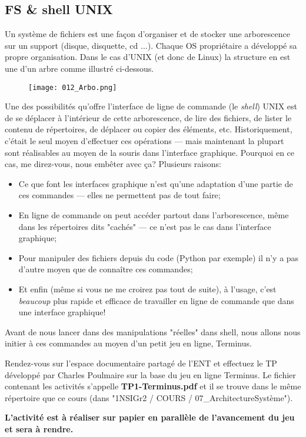 \documentclass[12pt]{article}
\begin{document}
	 
	 \subsection{FS \& shell UNIX}
	 
	 Un système de fichiers est une façon d'organiser et de stocker une arborescence sur un support (disque, disquette, cd ...). Chaque OS propriétaire a développé sa propre organisation. Dans le cas d'UNIX (et donc de Linux) la structure en est une d'un arbre comme illustré ci-dessous.
	
	\begin{figure}[H]
		\centering
		\texttt{[image: 012\_Arbo.png]}
	\end{figure}
	
	Une des possibilités qu'offre l'interface de ligne de commande (le \textit{shell}) UNIX est de se déplacer à l'intérieur de cette arborescence, de lire des fichiers, de lister le contenu de répertoires, de déplacer ou copier des éléments, etc. Historiquement, c'était le seul moyen d'effectuer ces opérations --- mais maintenant la plupart sont réalisables au moyen de la souris dans l'interface graphique. Pourquoi en ce cas, me direz-vous, nous embêter avec ça? Plusieurs raisons:
	\begin{itemize}
		\item Ce que font les interfaces graphique n'est qu'une adaptation d'une partie de ces commandes --- elles ne permettent pas de tout faire;
		\item En ligne de commande on peut accéder partout dans l'arborescence, même dans les répertoires dits "cachés" --- ce n'est pas le cas dans l'interface graphique;
		\item Pour manipuler des fichiers depuis du code (Python par exemple) il n'y a pas d'autre moyen que de connaître ces commandes;
		\item Et enfin (même si vous ne me croirez pas tout de suite), à l'usage, c'est \textit{beaucoup} plus rapide et efficace de travailler en ligne de commande que dans une interface graphique!
	\end{itemize}
	
	\begin{MonExo}
		Avant de nous lancer dans des manipulations "réelles" dans shell, nous allons nous initier à ces commandes au moyen d'un petit jeu en ligne, Terminus.
		\vspace{\baselineskip}
		
		Rendez-vous sur l'espace documentaire partagé de l'ENT et effectuez le TP développé par Charles Poulmaire sur la base du jeu en ligne Terminus. Le fichier contenant les activités s'appelle \textbf{TP1-Terminus.pdf} et il se trouve dans le même répertoire que ce cours (dans "1NSIGr2 / COURS / 07\_ArchitectureSystème").
		\vspace{\baselineskip}
		
		\textbf{L'activité est à réaliser sur papier en parallèle de l'avancement du jeu et sera à rendre.}
	\end{MonExo}
	 
	 
\end{document}
